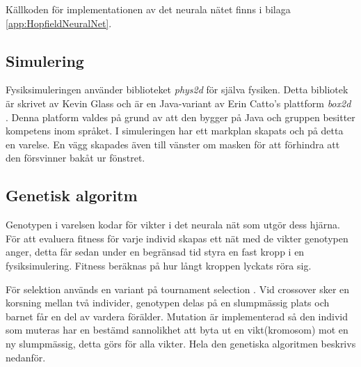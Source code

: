 \documentclass[titlepage, twocolumn, a4paper, 11pt, swedish]{article}
\begin{document}

Källkoden för implementationen av det neurala nätet finns i bilaga \vref{app:HopfieldNeuralNet}.

\subsection{Simulering}
Fysiksimuleringen använder biblioteket \textit{phys2d} \cite{phys2d} för själva fysiken. Detta bibliotek är skrivet av Kevin Glass och är en Java-variant av Erin Catto's plattform \textit{box2d} \cite{box2d}. Denna platform valdes på grund av att den bygger på Java och gruppen besitter kompetens inom språket. I simuleringen har ett markplan skapats och på detta en varelse. En vägg skapades även till vänster om masken för att förhindra att den försvinner bakåt ur fönstret.

\subsection{Genetisk algoritm}
Genotypen i varelsen kodar för vikter i det neurala nät som utgör dess hjärna. För att evaluera fitness för varje individ skapas ett nät med de vikter genotypen anger, detta får sedan under en begränsad tid styra en fast kropp i en fysiksimulering. Fitness beräknas på hur långt kroppen lyckats röra sig.

För selektion används en variant på tournament selection \cite{tournament}.
Vid crossover sker en korsning mellan två individer, genotypen delas på en slumpmässig plats och barnet får en del av vardera förälder. Mutation är implementerad så den individ som muteras har en bestämd sannolikhet att byta ut en vikt(kromosom) mot en ny slumpmässig, detta görs för alla vikter. Hela den genetiska algoritmen beskrivs nedanför.
\end{document}
